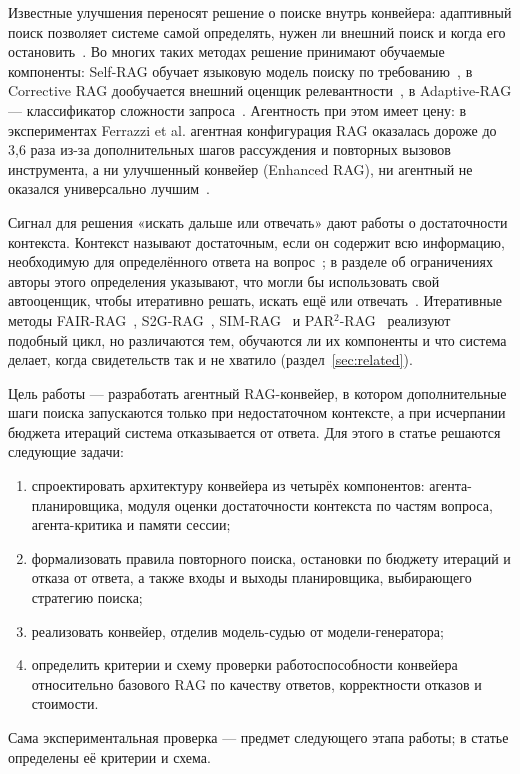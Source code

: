 \documentclass{misisarticle}
\begin{document}
Известные улучшения переносят решение о поиске внутрь конвейера: адаптивный поиск позволяет системе самой определять, нужен ли внешний поиск и когда его остановить~\cite{gao2023retrieval}. %
Во многих таких методах решение принимают обучаемые компоненты: Self-RAG обучает языковую модель поиску по требованию~\cite{asai2023selfrag}, %
в Corrective RAG дообучается внешний оценщик релевантности~\cite{yan2024corrective}, %
в Adaptive-RAG --- классификатор сложности запроса~\cite{jeong2024adaptive}. %
Агентность при этом имеет цену: в экспериментах Ferrazzi et al. агентная конфигурация RAG оказалась дороже до 3,6 раза из-за дополнительных шагов рассуждения и повторных вызовов инструмента, а ни улучшенный конвейер (Enhanced RAG), ни агентный не оказался универсально лучшим~\cite{ferrazzi2026agentic}. %

Сигнал для решения «искать дальше или отвечать» дают работы о достаточности контекста.
Контекст называют достаточным, если он содержит всю информацию, необходимую для определённого ответа на вопрос~\cite{joren2024sufficient}; %
в разделе об ограничениях авторы этого определения указывают, что могли бы использовать свой автооценщик, чтобы итеративно решать, искать ещё или отвечать~\cite{joren2024sufficient}. %
Итеративные методы FAIR-RAG~\cite{asl2025fairrag}, S2G-RAG~\cite{li2026s2grag}, SIM-RAG~\cite{yang2025knowing} и PAR$^2$-RAG~\cite{li2026par2} реализуют подобный цикл, но различаются тем, обучаются ли их компоненты и что система делает, когда свидетельств так и не хватило (раздел~\ref{sec:related}).

Цель работы --- разработать агентный RAG-конвейер, в котором дополнительные шаги поиска запускаются только при недостаточном контексте, а при исчерпании бюджета итераций система отказывается от ответа.
Для этого в статье решаются следующие задачи:
\begin{enumerate}[nosep]
  \item спроектировать архитектуру конвейера из четырёх компонентов: агента-планировщика, модуля оценки достаточности контекста по частям вопроса, агента-критика и памяти сессии;
  \item формализовать правила повторного поиска, остановки по бюджету итераций и отказа от ответа, а также входы и выходы планировщика, выбирающего стратегию поиска;
  \item реализовать конвейер, отделив модель-судью от модели-генератора;
  \item определить критерии и схему проверки работоспособности конвейера относительно базового RAG по качеству ответов, корректности отказов и стоимости.
\end{enumerate}
Сама экспериментальная проверка --- предмет следующего этапа работы; в статье определены её критерии и схема.
\end{document}
